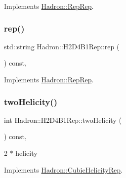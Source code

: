 Implements \mbox{\hyperlink{structHadron_1_1RepRep_ab3213025f6de249f7095892109575fde}{Hadron\+::\+Rep\+Rep}}.

\mbox{\label{structHadron_1_1H2D4B1Rep_a4f33e88c9985a78b47926b04736e7971}} 
\subsubsection{\texorpdfstring{rep()}{rep()}\hspace{0.1cm}{\footnotesize\ttfamily [5/5]}}
{\footnotesize\ttfamily std\+::string Hadron\+::\+H2\+D4\+B1\+Rep\+::rep (\begin{DoxyParamCaption}{ }\end{DoxyParamCaption}) const\hspace{0.3cm}{\ttfamily [inline]}, {\ttfamily [virtual]}}



Implements \mbox{\hyperlink{structHadron_1_1RepRep_ab3213025f6de249f7095892109575fde}{Hadron\+::\+Rep\+Rep}}.

\mbox{\label{structHadron_1_1H2D4B1Rep_af76e49b62cabfe0d55dec970eca37ca3}} 
\subsubsection{\texorpdfstring{twoHelicity()}{twoHelicity()}\hspace{0.1cm}{\footnotesize\ttfamily [1/3]}}
{\footnotesize\ttfamily int Hadron\+::\+H2\+D4\+B1\+Rep\+::two\+Helicity (\begin{DoxyParamCaption}{ }\end{DoxyParamCaption}) const\hspace{0.3cm}{\ttfamily [inline]}, {\ttfamily [virtual]}}

2 $\ast$ helicity 

Implements \mbox{\hyperlink{structHadron_1_1CubicHelicityRep_af507aa56fc2747eacc8cb6c96db31ecc}{Hadron\+::\+Cubic\+Helicity\+Rep}}.

\mbox{\label{structHadron_1_1H2D4B1Rep_af76e49b62cabfe0d55dec970eca37ca3}} 
